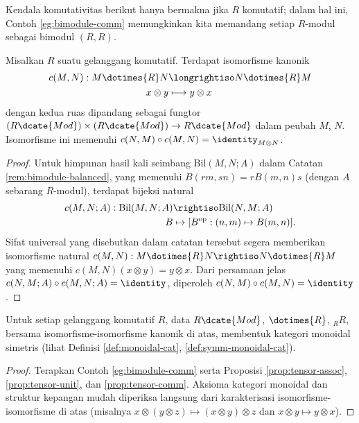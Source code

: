 Kendala komutativitas berikut hanya bermakna jika $R$ komutatif; dalam hal ini, Contoh \ref{eg:bimodule-comm} memungkinkan kita memandang setiap $R$-modul sebagai bimodul $(R,R)$.
\begin{proposition}\label{prop:tensor-comm}
	Misalkan $R$ suatu gelanggang komutatif. Terdapat isomorfisme kanonik
	\begin{align*}
		c(M, N): M \dotimes{R} N & \longrightiso N \dotimes{R} M \\
		x \otimes y & \longmapsto y \otimes x
	\end{align*}
	dengan kedua ruas dipandang sebagai fungtor $(R\dcate{Mod}) \times (R\dcate{Mod}) \to R\dcate{Mod}$ dalam peubah $M$, $N$. Isomorfisme ini memenuhi $c(N, M) \circ c(M, N) = \identity_{M \otimes N}$.
\end{proposition}
\begin{proof}
	Untuk himpunan hasil kali seimbang $\text{Bil}(M,N;A)$ dalam Catatan \ref{rem:bimodule-balanced}, yang memenuhi $B(rm, sn) = r B(m,n) s$ (dengan $A$ sebarang $R$-modul), terdapat bijeksi natural
	\begin{align*}
		c(M,N;A): \text{Bil}(M, N; A) & \rightiso \text{Bil}(N,M; A) \\
		B & \mapsto [B^\text{op}: (n,m) \mapsto B(m,n)].
	\end{align*}
	Sifat universal yang disebutkan dalam catatan tersebut segera memberikan isomorfisme natural $c(M,N): M \dotimes{R} N \rightiso N \dotimes{R} M$ yang memenuhi $c(M,N)(x \otimes y) = y \otimes x$. Dari persamaan jelas $c(N, M; A) \circ c(M, N; A) = \identity$, diperoleh $c(N, M) \circ c(M, N) = \identity$.
\end{proof}

\begin{corollary}\label{prop:module-monoidal-cat}
	Untuk setiap gelanggang komutatif $R$, data $R\dcate{Mod}$, $\dotimes{R}$, ${}_R R$, bersama isomorfisme-isomorfisme kanonik di atas, membentuk kategori monoidal simetris (lihat Definisi \ref{def:monoidal-cat}, \ref{def:symm-monoidal-cat}).
\end{corollary}
\begin{proof}
	Terapkan Contoh \ref{eg:bimodule-comm} serta Proposisi \ref{prop:tensor-assoc}, \ref{prop:tensor-unit}, dan \ref{prop:tensor-comm}. Aksioma kategori monoidal dan struktur kepangan mudah diperiksa langsung dari karakterisasi isomorfisme-isomorfisme di atas (misalnya $x \otimes (y \otimes z) \mapsto (x \otimes y) \otimes z$ dan $x \otimes y \mapsto y \otimes x$).
\end{proof}

